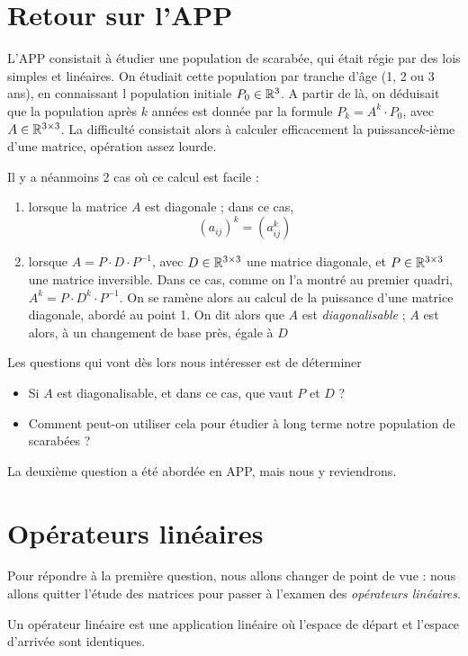 \section{Retour sur l'APP}

L'APP consistait à étudier une population de scarabée, qui était régie par des lois simples et linéaires. On étudiait cette population par tranche d'âge (1, 2 ou 3 ans), en connaissant l population initiale $P_0 \in \mathbb{R}^3$. A partir de là, on déduisait que la population après $k$ années est donnée par la formule $P_k = A^k \cdot P_0$, avec $A \in\mathbb{R}^{3 \times 3}$. La difficulté consistait alors à calculer efficacement la puissance$k$-ième d'une matrice, opération assez lourde.

Il y a néanmoins 2 cas où ce calcul est facile :
\begin{enumerate}
\item lorsque la matrice $A$ est diagonale ; dans ce cas,
\[ \left( a_{ij} \right)^k = \left( a_{ij}^k \right) \]
\item lorsque $A = P \cdot D \cdot P^{-1}$, avec $D \in \mathbb{R}^{3\times 3}$ une matrice diagonale, et $P \in \mathbb{R}^{3\times 3}$ une matrice inversible. Dans ce cas, comme on l'a montré au premier quadri, $A^k = P \cdot D^k \cdot P^{-1}$. On se ramène alors au calcul de la puissance d'une matrice diagonale, abordé au point 1. On dit alors que $A$ est \emph{diagonalisable} ; $A$ est alors, à un changement de base près, égale à $D$
\end{enumerate}

Les questions qui vont dès lors nous intéresser est de déterminer
\begin{itemize}
\item Si $A$ est diagonalisable, et dans ce cas, que vaut $P$ et $D$ ?
\item Comment peut-on utiliser cela pour étudier à long terme notre population de scarabées ?
\end{itemize}

La deuxième question a été abordée en APP, mais nous y reviendrons.

\section{Opérateurs linéaires}

Pour répondre à la première question, nous allons changer de point de vue : nous allons quitter l'étude des matrices pour passer à l'examen des \emph{opérateurs linéaires}.

\begin{defn}
Un opérateur linéaire est une application linéaire où l'espace de départ et l'espace d'arrivée sont identiques.
\end{defn}

